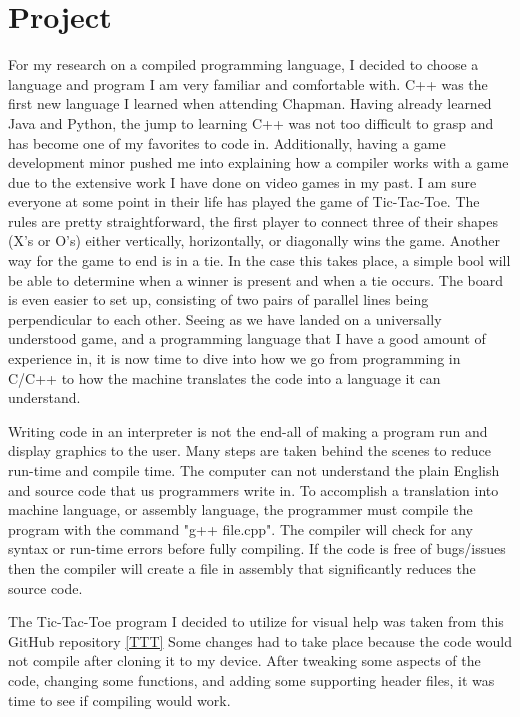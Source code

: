 \documentclass{article}
\theoremstyle{theorem}
\theoremstyle{definition}
\theoremstyle{remark}
\begin{document}
\section{Project}
For my research on a compiled programming language, I decided to choose a language and program I am very familiar and comfortable with. C++ was the first new language I learned when attending Chapman. Having already learned Java and Python, the jump to learning C++ was not too difficult to grasp and has become one of my favorites to code in. Additionally, having a game development minor pushed me into explaining how a compiler works with a game due to the extensive work I have done on video games in my past. I am sure everyone at some point in their life has played the game of Tic-Tac-Toe. The rules are pretty straightforward, the first player to connect three of their shapes (X's or O's) either vertically, horizontally, or diagonally wins the game. Another way for the game to end is in a tie. In the case this takes place, a simple bool will be able to determine when a winner is present and when a tie occurs. The board is even easier to set up, consisting of two pairs of parallel lines being perpendicular to each other. Seeing as we have landed on a universally understood game, and a programming language that I have a good amount of experience in, it is now time to dive into how we go from programming in C/C++ to how the machine translates the code into a language it can understand.

Writing code in an interpreter is not the end-all of making a program run and display graphics to the user. Many steps are taken behind the scenes to reduce run-time and compile time. The computer can not understand the plain English and source code that us programmers write in. To accomplish a translation into machine language, or assembly language, the programmer must compile the program with the command "g++ file.cpp". The compiler will check for any syntax or run-time errors before fully compiling. If the code is free of bugs/issues then the compiler will create a file in assembly that significantly reduces the source code. 

The Tic-Tac-Toe program I decided to utilize for visual help was taken from this GitHub repository \href{https://github.com/ssiddique-info/tic-tac-toe-in-c-}{[TTT]} Some changes had to take place because the code would not compile after cloning it to my device. After tweaking some aspects of the code, changing some functions, and adding some supporting header files, it was time to see if compiling would work.
\end{document}
